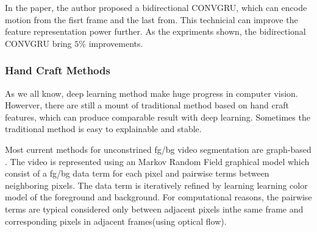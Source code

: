 In the paper, the author proposed a bidirectional CONVGRU, which can encode motion from the fisrt frame and the last from. This technicial can improve the feature
representation power further. As the expriments shown, the bidirectional CONVGRU bring $5\%$ improvements.

\subsubsection{Hand Craft Methods}

As we all know, deep learning method make huge progress in computer vision. Howerver, there are still a mount of traditional method based on 
hand craft features, which can produce comparable result with deep learning. Sometimes the traditional method is easy to explainable and stable.

Most current methods for unconstrined fg/bg video segmentation are graph-based \cite{Lee2011Key, Papazoglou2013Fast, zhang2013video}. The video
is represented using an Markov Random Field graphical model which consist of a fg/bg data term for each pixel and pairwise
terms between neighboring pixels. The data term is iteratively refined by learning learning color model of the foreground
and background. For computational reasons, the pairwise  terms are typical considered only between adjacent pixels inthe same 
frame and corresponding pixels in adjacent frames(using optical flow).







